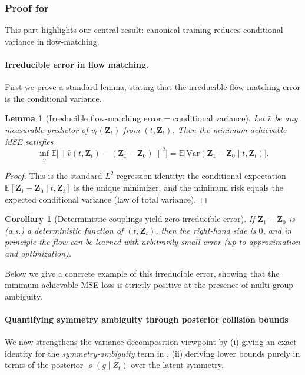 \documentclass{article}
\theoremstyle{plain}
\newtheorem{lemma}[theorem]{Lemma}
\newtheorem{corollary}[theorem]{Corollary}
\theoremstyle{definition}
\theoremstyle{remark}
\newcommand{\E}{\mathbb{E}}
\newcommand{\1}{\mathbf{1}}
\newcommand{\Z}{\mathbf{Z}}
\newcommand{\norm}[1]{\left\lVert #1\right\rVert}
\begin{document}
\subsubsection{Proof for }\label{subsubsec_appendix:proof_variance}
This part highlights our central result: canonical training reduces conditional variance in flow-matching. 

\paragraph{Irreducible error in flow matching.} First we prove a standard lemma, stating that the irreducible flow-matching error is the conditional variance.
\begin{lemma}[Irreducible flow-matching error = conditional variance]\label{lem:variance}
Let $\hat v$ be any measurable predictor of $v_t(\Z_t)$ from $(t,\Z_t)$. Then the minimum achievable MSE satisfies
\begin{equation}
\inf_{\hat v}\E\big[\norm{\hat v(t,\Z_t)-(\Z_1-\Z_0)}^2\big]
=\E\big[\mathrm{Var}(\Z_1-\Z_0\mid t,\Z_t)\big].
\end{equation}
\end{lemma}
\begin{proof}
This is the standard $L^2$ regression identity: the conditional expectation $\E[\Z_1-\Z_0\mid t,\Z_t]$ is the unique minimizer, and the minimum risk equals the expected conditional variance (law of total variance). \qedhere
\end{proof}

\begin{corollary}[Deterministic couplings yield zero irreducible error]\label{cor:det}
If $\Z_1-\Z_0$ is (a.s.) a deterministic function of $(t,\Z_t)$, then the right-hand side is $0$, and in principle the flow can be learned with arbitrarily small error (up to approximation and optimization).
\end{corollary}

Below we give a concrete example of this irreducible error, showing that the minimum achievable MSE loss is strictly positive at the presence of multi-group ambiguity.

\paragraph{Quantifying symmetry ambiguity through posterior collision bounds}\label{sec:quantify-ambiguity-and-misalignment}
We now strengthens the variance-decomposition viewpoint by (i) giving an exact identity for the
\emph{symmetry-ambiguity} term in ,
(ii) deriving lower bounds purely in terms of the posterior $\varrho(g\mid Z_t)$ over the latent symmetry.
\end{document}
